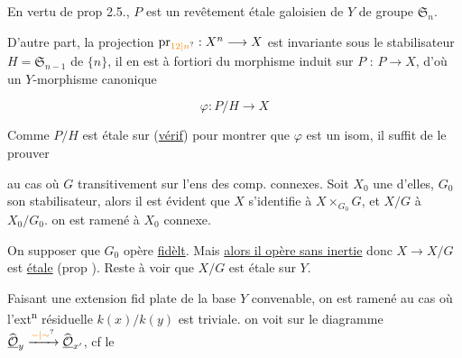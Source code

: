 En vertu de prop 2.5., $P$ est  un revêtement étale galoisien de $Y$ de groupe $\mathfrak S_n$.

D'autre part,  la   projection $\mathrm{pr}_{\unsure{12|n}}:X^n\longrightarrow X$  est invariante sous le stabilisateur $H=\mathfrak S_{n-1}$ de $\{n\}$,  il en est à fortiori du morphisme induit sur $P$ : $P\longrightarrow X$, d'où un  $Y$-morphisme canonique

\[
\varphi:P/H\longrightarrow X
\]


Comme $P/H$ est étale sur  (\uline{vérif})  pour montrer que $\varphi$ est un isom, il suffit de le prouver


 au cas où $G$  transitivement sur l'ens des comp. connexes. Soit $X_0$  une d'elles, $G_0$ son stabilisateur, alors il est évident que $X$ s'identifie à $X\times_{G_0}G$, et $X/G$ à $X_0/G_0$.  on est ramené à $X_0$ connexe.


On  supposer que $G_0$ opère \uline{fidèlt}. Mais \uline{alors il opère sans inertie} donc $X\longrightarrow X/G$ est \uline{étale} (prop \unsure{--}). Reste à voir que $X/G$ est étale sur $Y$.

Faisant une extension fid plate de la base $Y$ convenable, on est ramené au cas où l'ext\textsuperscript{n} résiduelle $k(x)/k(y)$ est triviale.  on voit sur le diagramme $\widehat{\underline{\mathcal O}}_y\xrightarrow{\unsure{-|\sim}}\widehat{\underline{\mathcal O}}_{x'}$, cf le


